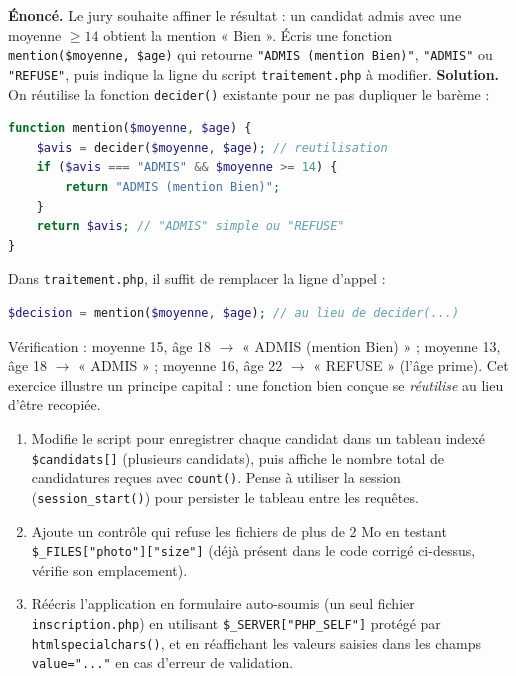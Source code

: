 \documentclass[11pt]{article}
\begin{document}
\begin{exoresolu}
\textbf{Énoncé.} Le jury souhaite affiner le résultat : un candidat admis avec une moyenne $\geq 14$ obtient la mention « Bien ». Écris une fonction \texttt{mention(\$moyenne, \$age)} qui retourne \texttt{"ADMIS (mention Bien)"}, \texttt{"ADMIS"} ou \texttt{"REFUSE"}, puis indique la ligne du script \texttt{traitement.php} à modifier.
\tcblower
\textbf{Solution.} On réutilise la fonction \texttt{decider()} existante pour ne pas dupliquer le barème :

\begin{lstlisting}[language=Php]
function mention($moyenne, $age) {
    $avis = decider($moyenne, $age); // reutilisation
    if ($avis === "ADMIS" && $moyenne >= 14) {
        return "ADMIS (mention Bien)";
    }
    return $avis; // "ADMIS" simple ou "REFUSE"
}
\end{lstlisting}

Dans \texttt{traitement.php}, il suffit de remplacer la ligne d'appel :
\begin{lstlisting}[language=Php]
$decision = mention($moyenne, $age); // au lieu de decider(...)
\end{lstlisting}
Vérification : moyenne 15, âge 18 $\rightarrow$ « ADMIS (mention Bien) » ; moyenne 13, âge 18 $\rightarrow$ « ADMIS » ; moyenne 16, âge 22 $\rightarrow$ « REFUSE » (l'âge prime). Cet exercice illustre un principe capital : une fonction bien conçue se \emph{réutilise} au lieu d'être recopiée.
\end{exoresolu}

\begin{exercice}
\begin{enumerate}
\item Modifie le script pour enregistrer chaque candidat dans un tableau indexé \texttt{\$candidats[]} (plusieurs candidats), puis affiche le nombre total de candidatures reçues avec \texttt{count()}. Pense à utiliser la session (\texttt{session\_start()}) pour persister le tableau entre les requêtes.
\item Ajoute un contrôle qui refuse les fichiers de plus de 2 Mo en testant \texttt{\$\_FILES["photo"]["size"]} (déjà présent dans le code corrigé ci-dessus, vérifie son emplacement).
\item Réécris l'application en formulaire auto-soumis (un seul fichier \texttt{inscription.php}) en utilisant \texttt{\$\_SERVER["PHP\_SELF"]} protégé par \texttt{htmlspecialchars()}, et en réaffichant les valeurs saisies dans les champs \texttt{value="..."} en cas d'erreur de validation.
\end{enumerate}
\end{exercice}
\end{document}
